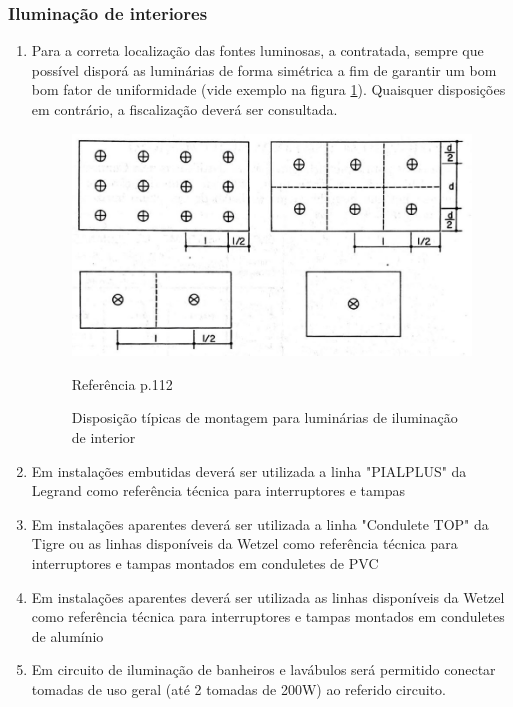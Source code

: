 \subsubsection{Iluminação de interiores}\label {section: iluminacao_interiores}
	\begin{enumerate}
		\item Para a correta localização das fontes luminosas, a contratada, sempre que possível disporá as luminárias de forma simétrica a fim de garantir um bom bom fator de uniformidade (vide exemplo na figura \ref*{fig: disposicao}). Quaisquer disposições em contrário, a fiscalização deverá ser consultada.
		\begin{figure}[H]
			\centering
			\includegraphics[width=\textwidth]{Figures/3. Lighting/light-disposicao.jpg}
			\hfill
			\caption{Disposição típicas de montagem para luminárias de iluminação de interior}  Referência \cite{de1987iluminação} p.112
			\label{fig: disposicao}
		\end{figure}
		
		\item Em instalações embutidas deverá ser utilizada a linha "PIALPLUS" da Legrand como referência técnica para interruptores e tampas
		
		\item Em instalações aparentes deverá ser utilizada a linha "Condulete TOP" da Tigre ou as linhas disponíveis da Wetzel como referência técnica para interruptores e tampas montados em conduletes de PVC
		
		\item Em instalações aparentes deverá ser utilizada as linhas disponíveis da Wetzel como referência técnica para interruptores e tampas montados em conduletes de alumínio
		
		\item\label{light:wc1}Em circuito de iluminação de banheiros e lavábulos será permitido conectar tomadas de uso geral (até 2 tomadas de 200W) ao referido circuito.
		

\end{enumerate}
